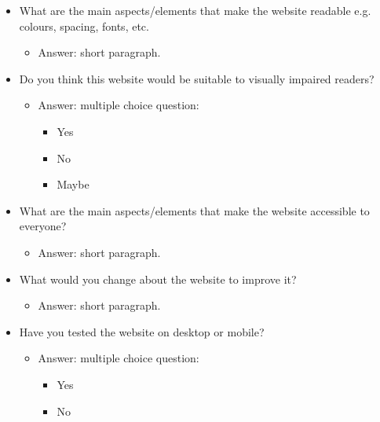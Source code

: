 \documentclass[letterpaper,12pt]{article}
\begin{document}
\begin{appendices}
\begin{itemize}
    \item What are the main aspects/elements that make the website readable e.g. colours, spacing, fonts, etc.
    \begin{itemize}
        \item Answer: short paragraph.
    \end{itemize}
\end{itemize}

\begin{itemize}
    \item Do you think this website would be suitable to visually impaired readers?
    \begin{itemize}
        \item Answer: multiple choice question:
        \begin{itemize}
            \item Yes
            \item No
            \item Maybe
        \end{itemize}
    \end{itemize}
\end{itemize}

\begin{itemize}
    \item What are the main aspects/elements that make the website accessible to everyone?
    \begin{itemize}
        \item Answer: short paragraph.
    \end{itemize}
\end{itemize}

\begin{itemize}
    \item What would you change about the website to improve it?
    \begin{itemize}
        \item Answer: short paragraph.
    \end{itemize}
\end{itemize}

\begin{itemize}
    \item Have you tested the website on desktop or mobile?
    \begin{itemize}
        \item Answer: multiple choice question:
        \begin{itemize}
            \item Yes
            \item No
        \end{itemize}
    \end{itemize}
\end{itemize}


\end{appendices}
\end{document}
